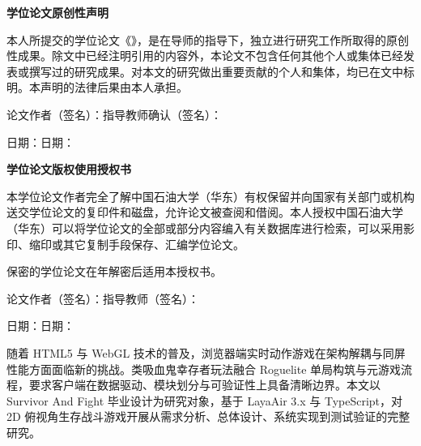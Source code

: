 \clearpage
\thispagestyle{empty}
\vspace*{0.5cm}
{\heiti{}\bfseries 学位论文原创性声明\par}
\vspace{1em}
\songti{}
\setlength{\parindent}{2em}
本人所提交的学位论文《\thesistitle》，是在导师的指导下，独立进行研究工作所取得的原创性成果。除文中已经注明引用的内容外，本论文不包含任何其他个人或集体已经发表或撰写过的研究成果。对本文的研究做出重要贡献的个人和集体，均已在文中标明。本声明的法律后果由本人承担。

\vspace{1.5em}
\noindent 论文作者（签名）：\underline{\hspace{3.8cm}}\quad 指导教师确认（签名）：\underline{\hspace{3.8cm}}

\noindent 日期：\underline{\hspace{3.8cm}}\hspace{2.2cm}日期：\underline{\hspace{3.8cm}}

\vspace{2.5em}
{\heiti{}\bfseries 学位论文版权使用授权书\par}
\vspace{1em}
本学位论文作者完全了解中国石油大学（华东）有权保留并向国家有关部门或机构送交学位论文的复印件和磁盘，允许论文被查阅和借阅。本人授权中国石油大学（华东）可以将学位论文的全部或部分内容编入有关数据库进行检索，可以采用影印、缩印或其它复制手段保存、汇编学位论文。

\vspace{0.8em}
\noindent 保密的学位论文在\underline{\hspace{2cm}}年解密后适用本授权书。

\vspace{1.5em}
\noindent 论文作者（签名）：\underline{\hspace{3.8cm}}\quad 指导教师（签名）：\underline{\hspace{3.8cm}}

\noindent 日期：\underline{\hspace{3.8cm}}\hspace{2.2cm}日期：\underline{\hspace{3.8cm}}

\clearpage
\pagestyle{frontmatterheader}
\upcabstracttitle
\songti{}
\setlength{\parindent}{2em}
随着 HTML5 与 WebGL 技术的普及，浏览器端实时动作游戏在架构解耦与同屏性能方面面临新的挑战。类吸血鬼幸存者玩法融合 Roguelite 单局构筑与元游戏流程，要求客户端在数据驱动、模块划分与可验证性上具备清晰边界。本文以 Survivor And Fight 毕业设计为研究对象，基于 LayaAir 3.x 与 TypeScript，对 2D 俯视角生存战斗游戏开展从需求分析、总体设计、系统实现到测试验证的完整研究。

